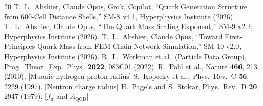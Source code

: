 \documentclass[12pt,a4paper]{article}
\begin{document}
\begin{thebibliography}{20}
 T.~L.~Abshier, Claude Opus, Grok, Copilot, ``Quark Generation Structure from 600-Cell Distance Shells,'' SM-8 v4.1, Hyperphysics Institute (2026).
 T.~L.~Abshier, Claude Opus, ``The Quark Mass Scaling Exponent,'' SM-9 v2.2, Hyperphysics Institute (2026).
 T.~L.~Abshier, Claude Opus, ``Toward First-Principles Quark Mass from FEM Chain Network Simulation,'' SM-10 v2.0, Hyperphysics Institute (2026).
 R.~L.~Workman et al.\ (Particle Data Group), Prog.\ Theor.\ Exp.\ Phys.\ \textbf{2022}, 083C01 (2022).
 R.~Pohl et al., Nature \textbf{466}, 213 (2010). [Muonic hydrogen proton radius]
 S.~Kopecky et al., Phys.\ Rev.\ C \textbf{56}, 2229 (1997). [Neutron charge radius]
 H.~Pagels and S.~Stokar, Phys.\ Rev.\ D \textbf{20}, 2947 (1979). [$f_\pi$ and $\Lambda_{\mathrm{QCD}}$]
\end{thebibliography}
\end{document}
